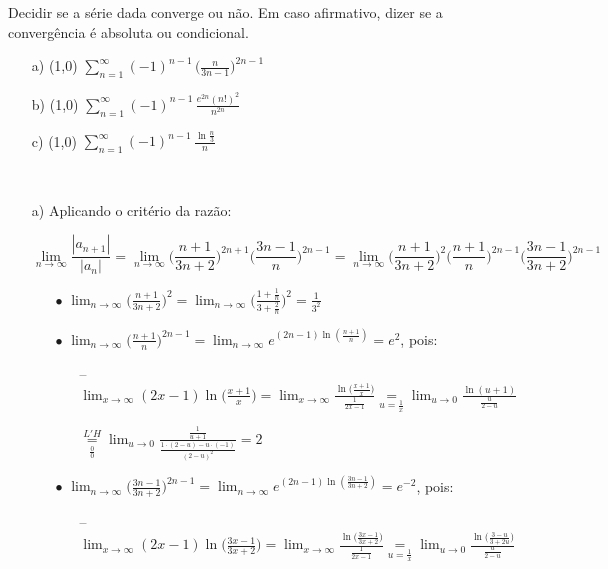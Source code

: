 \documentclass[12pt,a4paper]{article}
\begin{document}
 Decidir se a série dada converge ou não. Em caso afirmativo, dizer se a convergência é absoluta ou condicional.

\begin{itemize}
\item[a)] (1,0) $\displaystyle\sum_{n=1}^\infty (-1)^{n-1} \, \Big( \frac{n}{3n-1} \Big)^{2n-1}$
\item[b)] (1,0) $\displaystyle\sum_{n=1}^\infty (-1)^{n-1} \, \frac{e^{2n} (n!)^2}{n^{2n}}$
\item[c)] (1,0) $\displaystyle\sum_{n=1}^\infty (-1)^{n-1} \, \frac{\ln \frac{n}{3}}{n}$
\end{itemize}

 \\

\begin{itemize}
\item[a)] Aplicando o critério da razão:

$$\lim_{n\rightarrow\infty} \frac{|a_{n+1}|}{|a_n|} = \lim_{n\rightarrow\infty} \Big( \frac{n+1}{3n+2} \Big)^{2n+1} \Big( \frac{3n-1}{n} \Big)^{2n-1} = \lim_{n\rightarrow\infty}  \Big( \frac{n+1}{3n+2} \Big)^2 \Big( \frac{n+1}{n} \Big)^{2n-1} \Big( \frac{3n-1}{3n+2} \Big)^{2n-1} $$

\begin{itemize}
\item[$\bullet$] $\displaystyle\lim_{n\rightarrow\infty}  \Big( \displaystyle\frac{n+1}{3n+2} \Big)^2 = \displaystyle\lim_{n\rightarrow\infty}  \Big( \displaystyle\frac{1+\frac{1}{n}}{3+\frac{2}{n}} \Big)^2 = \displaystyle\frac{1}{3^2} $
\item[$\bullet$] $\displaystyle\lim_{n\rightarrow\infty} \Big( \displaystyle\frac{n+1}{n} \Big)^{2n-1} = \displaystyle\lim_{n\rightarrow\infty} e^{(2n-1) \ln(\frac{n+1}{n})} = e^2$, pois:
\begin{itemize}
\item[--] $\displaystyle\lim_{x\rightarrow\infty} (2x-1) \ln\Big(\frac{x+1}{x}\Big) = \displaystyle\lim_{x\rightarrow\infty} \frac{ \ln\big(\frac{x+1}{x}\big) }{\frac{1}{2x-1}} \underset{u = \frac{1}{x}}{=} \displaystyle\lim_{u\rightarrow 0} \frac{ \ln(u+1) }{\frac{u}{2-u}}$

$\underset{\frac{0}{0}}{\overset{L'H}{=}} \displaystyle\lim_{u\rightarrow 0} \displaystyle \frac{\frac{1}{u+1}}{\frac{1\cdot(2-u)-u\cdot(-1)}{(2-u)^2}}=2$
\end{itemize}
\item[$\bullet$] $\displaystyle\lim_{n\rightarrow\infty} \Big( \displaystyle\frac{3n-1}{3n+2} \Big)^{2n-1} = \displaystyle\lim_{n\rightarrow\infty} e^{(2n-1) \ln(\frac{3n-1}{3n+2})} = e^{-2}$, pois:
\begin{itemize}
\item[--] $\displaystyle\lim_{x\rightarrow\infty} (2x-1) \ln\Big(\frac{3x-1}{3x+2}\Big) = \displaystyle\lim_{x\rightarrow\infty} \frac{ \ln\big(\frac{3x-1}{3x+2}\big) }{\frac{1}{2x-1}} \underset{u = \frac{1}{x}}{=} \displaystyle\lim_{u\rightarrow 0} \frac{ \ln\big(\frac{3-u}{3+2u}\big) }{\frac{u}{2-u}}$


\end{itemize}
\end{itemize}
\end{itemize}
\end{document}
